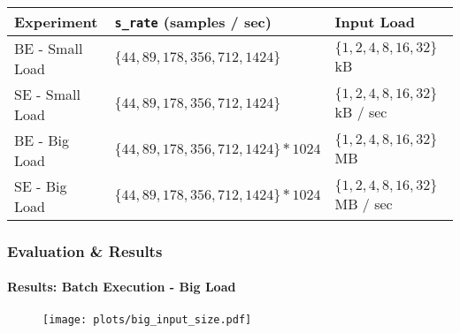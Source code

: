 \documentclass[10pt,    %
    english,            %
    xcolor=table,       %
    envcountsect,        %
    aspectratio=169     %
]{beamer}
\begin{document}
\begin{frame}
    \begin{table}[t]
        \centering
        \begin{tabular}{L{2.8cm}C{5.5cm}C{4.2cm}}
            \hline
            \textbf{Experiment} & \footnotesize{\textbf{\texttt{s\_rate} (samples / sec)}} & \textbf{Input Load} \\[3pt]
            \hline
            BE - Small Load & $\lbrace 44, 89, 178, 356, 712, 1424 \rbrace $ & $\lbrace 1, 2, 4, 8, 16, 32 \rbrace$ kB \\[3pt]
            SE - Small Load & $\lbrace 44, 89, 178, 356, 712, 1424 \rbrace$ & $\lbrace 1, 2, 4, 8, 16, 32 \rbrace$ kB / sec\\[3pt]
            BE - Big Load & $\lbrace 44, 89, 178, 356, 712, 1424 \rbrace * 1024$ & $\lbrace 1, 2, 4, 8, 16, 32 \rbrace$ MB \\[3pt]
            SE - Big Load & $\lbrace 44, 89, 178, 356, 712, 1424 \rbrace * 1024$ & $\lbrace 1, 2, 4, 8, 16, 32 \rbrace$ MB / sec\\[3pt]
            \hline
        \end{tabular}
    \end{table}

\end{frame}

%
%
%

\begin{frame}
    \frametitle{Evaluation \& Results}
    \framesubtitle{Results: Batch Execution - Big Load}

    \vspace{-15pt}

    \begin{figure}[T]
        \centering
        \texttt{[image: plots/big\_input\_size.pdf]}
    \end{figure}

\end{frame}
\end{document}
